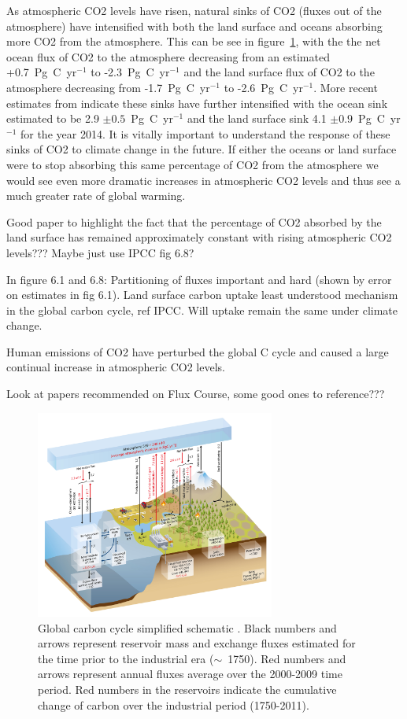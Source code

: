 \documentclass[11pt]{article}
\begin{document}
As atmospheric CO2 levels have risen, natural sinks of CO2 (fluxes out of the atmosphere) have intensified with both the land surface and oceans absorbing more CO2 from the atmosphere. This can be see in figure~\ref{fig:ipcc_fig6.1}, with the the net ocean flux of CO2 to the atmosphere decreasing from an estimated +0.7~Pg~C~yr\(^{-1}\) to -2.3~Pg~C~yr\(^{-1}\) and the land surface flux of CO2 to the atmosphere decreasing from -1.7~Pg~C~yr\(^{-1}\) to -2.6~Pg~C~yr\(^{-1}\). More recent estimates from \citet{le2015global} indicate these sinks have further intensified with the ocean sink estimated to be 2.9 \(\pm 0.5\)~Pg~C~yr\(^{-1}\) and the land surface sink 4.1 \(\pm 0.9\)~Pg~C~yr\(^{-1}\) for the year 2014. It is vitally important to understand the response of these sinks of CO2 to climate change in the future. If either the oceans or land surface were to stop absorbing this same percentage of CO2 from the atmosphere we would see even more dramatic increases in atmospheric CO2 levels and thus see a much greater rate of global warming.  

Good paper to highlight the fact that the percentage of CO2 absorbed by the land surface has remained approximately constant with rising atmospheric CO2 levels??? Maybe just use IPCC fig 6.8?

In figure 6.1 and 6.8: Partitioning of fluxes important and hard (shown by error on estimates in fig 6.1). Land surface carbon uptake least understood mechanism in the global carbon cycle, ref IPCC. Will uptake remain the same under climate change.

Human emissions of CO2 have perturbed the global C cycle and caused a large continual increase in atmospheric CO2 levels.

Look at papers recommended on Flux Course, some good ones to reference???

\begin{figure}[ht]
    \centering
    \includegraphics[width=0.7\textwidth]{ipcc_fig6_1.jpg}
    \caption{Global carbon cycle simplified schematic \citep{ciais2014carbon}. Black numbers and arrows represent reservoir mass and exchange fluxes estimated for the time prior to the industrial era (\(\sim\)~1750). Red numbers and arrows represent annual fluxes average over the 2000-2009 time period. Red numbers in the reservoirs indicate the cumulative change of carbon over the industrial period (1750-2011).}
    \label{fig:ipcc_fig6.1}
\end{figure}
\end{document}
